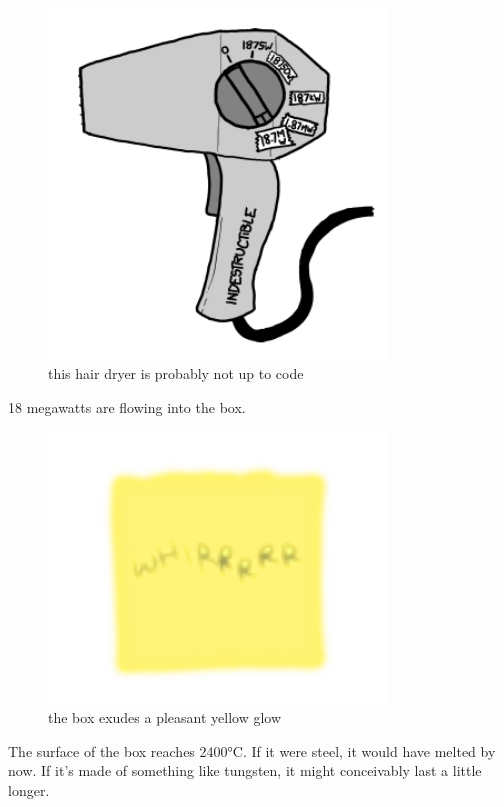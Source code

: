 \begin{figure}[!htbp]
\centering
\includegraphics[scale=0.5, max width=0.8\textwidth]{imgs/a/35/hair_dryer_18750000.png}
\caption{this hair dryer is probably not up to code}
\end{figure}

{18 megawatts are flowing into the box.}

\begin{figure}[!htbp]
\centering
\includegraphics[scale=0.5, max width=0.8\textwidth]{imgs/a/35/hair_dryer_box2400.png}
\caption{the box exudes a pleasant yellow glow}
\end{figure}

{The surface of the box reaches 2400°C. If it were steel, it would have melted by now. If it’s made of something like tungsten, it might conceivably last a little longer.}

